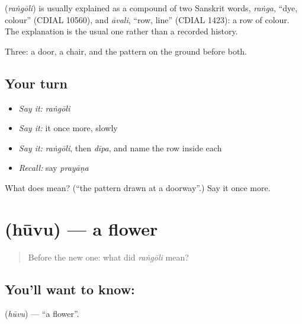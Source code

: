 \begin{cousinweb}
\textbf{} (\emph{raṅgōli}) is usually explained as a compound of two Sanskrit words, \emph{raṅga}, \textquotedblleft{}dye, colour\textquotedblright{} (CDIAL 10560), and \emph{āvali}, \textquotedblleft{}row, line\textquotedblright{} (CDIAL 1423): a row of colour. The explanation is the usual one rather than a recorded history.
\end{cousinweb}

\begin{grammarlens}[title={What you've built}]
Three: a door, a chair, and the pattern on the ground before both.
\end{grammarlens}

\subsection*{Your turn}
\begin{itemize}
\raggedright
  \item \emph{Say it:} \emph{raṅgōli}
  \item \emph{Say it:} it once more, slowly
  \item \emph{Say it:} \emph{raṅgōli}, then \emph{dīpa}, and name the row inside each
  \item \emph{Recall:} say \emph{prayāṇa}
\end{itemize}

\begin{tcolorbox}[breakable,colback=teal!4,colframe=teal!35!black,title={Before you move on}]
What does  mean? (\textquotedblleft{}the pattern drawn at a doorway\textquotedblright{}.) Say it once more.
\end{tcolorbox}
\section[\texorpdfstring{\kn{ಹೂವು} (hūvu)}{ಹೂವು (hūvu)}]{ (hūvu) — a flower}

\label{lesson:KA-C52-flower}



\begin{quote}
Before the new one: what did \emph{raṅgōli} mean?
\end{quote}

\subsection*{You'll want to know: }
\textbf{} (\emph{hūvu}) — \textquotedblleft{}a flower\textquotedblright{}.

